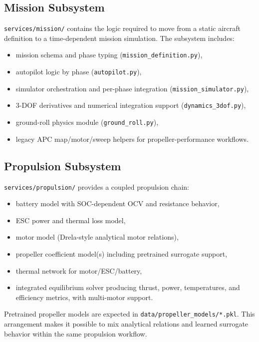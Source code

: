 \subsection{Mission Subsystem}
\texttt{services/mission/} contains the logic required to move from a static aircraft definition to a time-dependent mission simulation. The subsystem includes:
\begin{itemize}
\item mission schema and phase typing (\texttt{mission\_definition.py}),
\item autopilot logic by phase (\texttt{autopilot.py}),
\item simulator orchestration and per-phase integration (\texttt{mission\_simulator.py}),
\item 3-DOF derivatives and numerical integration support (\texttt{dynamics\_3dof.py}),
\item ground-roll physics module (\texttt{ground\_roll.py}),
\item legacy APC map/motor/sweep helpers for propeller-performance workflows.
\end{itemize}

\subsection{Propulsion Subsystem}
\texttt{services/propulsion/} provides a coupled propulsion chain:
\begin{itemize}
\item battery model with SOC-dependent OCV and resistance behavior,
\item ESC power and thermal loss model,
\item motor model (Drela-style analytical motor relations),
\item propeller coefficient model(s) including pretrained surrogate support,
\item thermal network for motor/ESC/battery,
\item integrated equilibrium solver producing thrust, power, temperatures, and efficiency metrics, with multi-motor support.
\end{itemize}

Pretrained propeller models are expected in \texttt{data/propeller\_models/*.pkl}. This arrangement makes it possible to mix analytical relations and learned surrogate behavior within the same propulsion workflow.

